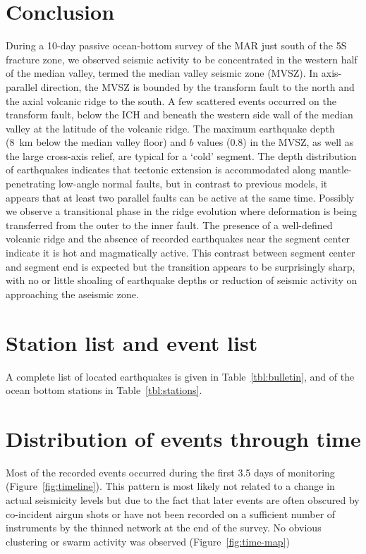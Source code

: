 \documentclass[jgr]{agu2001}
\newlength{\tw}
\begin{document}
\begin{article}
\section{Conclusion}

During a 10-day passive ocean-bottom survey of the  MAR just south
of the 5\dg S fracture zone, we observed seismic activity to be
concentrated in the western half of the median valley, termed the median valley
seismic zone (MVSZ). In axis-parallel direction, the MVSZ is bounded
by the transform fault to the north and the axial
volcanic ridge to the south.  A few scattered events occurred on the transform
fault, below the ICH and beneath the western side wall of the median
valley at the latitude of the volcanic ridge. The maximum earthquake
depth (8~km below the median valley floor) and $b$ values (0.8) in the MVSZ, as well as the large
cross-axis relief, are typical for a `cold' segment.  The depth
distribution of earthquakes indicates that tectonic extension is
accommodated along mantle-penetrating low-angle normal faults, but in contrast to
previous models, it appears that at least two parallel faults can be
active at the same time.  
Possibly we observe a transitional phase in the ridge
evolution where deformation is being transferred from the outer to the
inner fault.
The presence of a well-defined volcanic
ridge and the absence of recorded earthquakes near the segment center
indicate it is hot and magmatically active.  This contrast between
segment center and segment end is expected but the transition appears
to be surprisingly sharp, with no or little shoaling of earthquake
depths or reduction of seismic activity on approaching the aseismic
zone. 



\appendix

\section{Station list and event list}

A complete list of located earthquakes is given in
Table~\ref{tbl:bulletin}, and of the ocean bottom stations in Table~\ref{tbl:stations}.

\section{Distribution of events through time}

Most of the recorded events occurred during the first 3.5 days of
monitoring (Figure~\ref{fig:timeline}). This pattern is most likely not
related to a change in actual seismicity levels but due to the fact
that later events are often obscured by co-incident airgun shots or
have not been  recorded  on a sufficient number
of instruments by the thinned network at the end of the survey.   No
obvious clustering or swarm activity was observed (Figure~\ref{fig:time-map})


\end{article}
\end{document}
